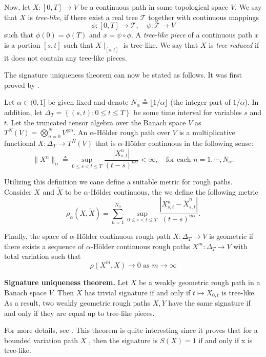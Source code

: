 Now, let $X : [0, T] \to V$ be a continuous path in some topological space $V$. We say that $X$ is \textit{tree-like}, if there exist a real tree $\mathcal{T}$ together with continuous mappings
\[
\phi : [0, T] \to \mathcal{T}, \quad \psi : \mathcal{T} \to V
\]
such that $\phi(0) = \phi(T)$ and $x = \psi \circ \phi$. A \textit{tree-like piece} of a continuous path $x$ is a portion $[s, t]$ such that $X\mid_{[s,t]}$ is tree-like. We say that $X$ is \textit{tree-reduced} if it does not contain any tree-like pieces.


The signature uniqueness theorem can now be stated as follows. It was first
proved by \cite{boedihardjo2016signature}.


Let $\alpha \in (0,1]$ be given fixed and denote $N_{\alpha} \triangleq \lfloor 1/\alpha \rfloor$ (the integer part of $1/\alpha$). In addition, let $\Delta _{T} = \left\{ ( s,t) : 0 \le t \le T \right\} $ be some time interval for variables $s $
and $t$. Let the truncated tensor algebra over the Banach space $V$ as $T^{N}( V) = \bigotimes_{n= 0} ^{N} V^{ \otimes n}  $.     An $\alpha$-Hölder rough path over $V$ is a multiplicative functional $X : \Delta_T \to T_{}^N(V)$ that is $\alpha$-Hölder continuous in the following sense:
\[
\|X^n\|_{\alpha} \triangleq \sup_{0 \leq s < t \leq T} \frac{|X_{s,t}^n|}{(t-s)^{n\alpha}} < \infty, \quad \text{for each } n = 1, \cdots, N_{\alpha}.
\]

Utilizing this definition we cane define a suitable metric for rough paths. Consider $X_{}$ and $\widetilde{X}$ to be $\alpha$-Hölder continuous, the we define the following metric \begin{equation}
\rho _{\alpha }( X, \widetilde{X})  = \sum_{n=1}^{N_{\alpha }} \sup_{0 \le s < t \le T  } \frac{| X_{s,t}^{n} - \widetilde{X}_{s,t}^{n}  |   }{( t -s)^{n\alpha } }.
\end{equation}

Finally, the space of $\alpha$-Hölder continuous rough path $X: \Delta _{T} \to  V$ is geometric if there exists a sequence of $\alpha$-Hölder continuous rough paths $X^{m} : \Delta _{T} \to  V $ with total variation such that \begin{equation}
    \rho ( X^{m}, X) \to  0  \text{ as } m \to \infty
\end{equation}



\begin{theorem}
\textbf{Signature uniqueness theorem.}
Let $X$ be a weakly geometric rough path in a Banach space $V$. Then $X$ has trivial signature if and only if $t \mapsto X_{0,t}$ is tree-like. As a result, two weakly geometric rough paths $X, Y$ have the same signature if and only if they are equal up to tree-like pieces.
\end{theorem}

For more details, see \cite{boedihardjo2016signature, hambly2010uniqueness, geng2015signature, geng2017reconstruction}. This theorem is quite interesting since it proves that for a bounded variation path $X$ , then the signature is $S( X) = 1 $ if and only if x is tree-like.



